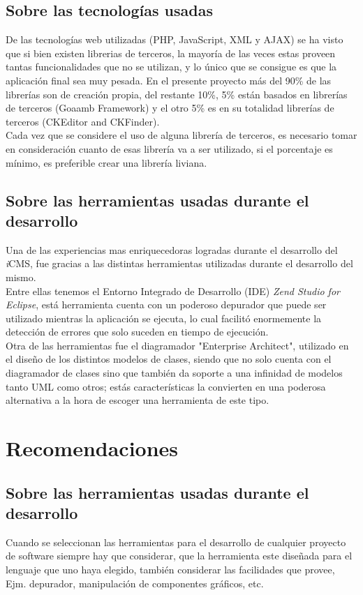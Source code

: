 \subsection{Sobre las tecnolog\'ias usadas}
De las tecnolog\'ias web utilizadas (PHP, JavaScript, XML y AJAX) se ha visto que si bien existen librerias de terceros, la mayor\'ia de las veces estas proveen tantas funcionalidades que no se utilizan, y lo \'unico que se consigue es que la aplicaci\'on final sea muy pesada. En el presente proyecto m\'as del 90\% de las librer\'ias son de creaci\'on propia, del restante 10\%, 5\% est\'an basados en librer\'ias de terceros (Goaamb Framework) y el otro 5\% es en su totalidad librer\'ias de terceros (CKEditor and CKFinder).\\
Cada vez que se considere el uso de alguna librer\'ia de terceros, es necesario tomar en consideraci\'on cuanto de esas librer\'ia va a ser utilizado, si el porcentaje es m\'inimo, es preferible crear una librer\'ia liviana. 

\subsection{Sobre las herramientas usadas durante el desarrollo}
Una de las experiencias mas enriquecedoras logradas durante el desarrollo del \textit{i}CMS, fue gracias a las distintas herramientas utilizadas durante el desarrollo del mismo.\\ Entre ellas tenemos el Entorno Integrado de Desarrollo (IDE) \emph{Zend Studio for Eclipse}, est\'a herramienta cuenta con un poderoso depurador que puede ser utilizado mientras la aplicaci\'on se ejecuta, lo cual facilit\'o enormemente la detecci\'on de errores que solo suceden en tiempo de ejecuci\'on.\\
Otra de las herramientas fue el diagramador "Enterprise Architect", utilizado en el dise\~no de los distintos modelos de clases, siendo que no solo cuenta con el diagramador de clases sino que tambi\'en da soporte a una infinidad de modelos tanto UML como otros; est\'as caracter\'isticas la convierten en una poderosa alternativa a la hora de escoger una herramienta de este tipo.

\section{Recomendaciones}

\subsection{Sobre las herramientas usadas durante el desarrollo}
Cuando se seleccionan las herramientas para el desarrollo de cualquier proyecto de software siempre hay que considerar, que la herramienta este dise\~nada para el lenguaje que uno haya elegido, tambi\'en considerar las facilidades que provee, Ejm. depurador, manipulaci\'on de componentes gr\'aficos, etc.

